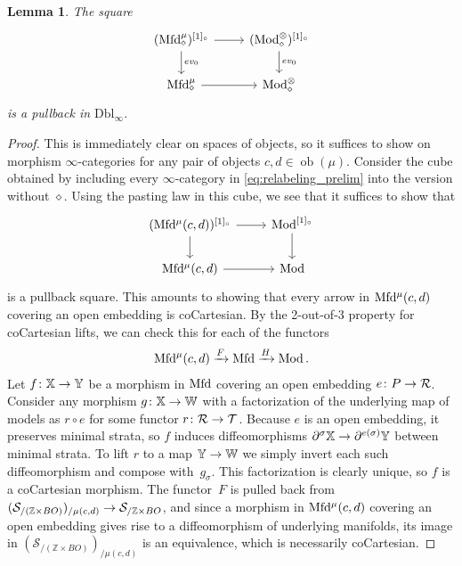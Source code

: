 \documentclass[10pt]{amsart}
\numberwithin{equation}{section}
\newtheorem{lem}[prop]{Lemma}
\theoremstyle{definition}
\DeclareMathOperator{\Mod}{Mod}
\DeclareMathOperator{\ob}{ob}
\newcommand{\Mfd}{\mathrm{Mfd}\vphantom{d}}
\newcommand{\bZ}{\mathbb{Z}}
\newcommand{\bX}{\mathbb{X}}
\newcommand{\bY}{\mathbb{Y}}
\newcommand{\bW}{\mathbb{W}}
\newcommand{\cS}{\mathcal{S}}
\newcommand{\cR}{\mathcal{R}}
\newcommand{\cT}{\mathcal{T}}
\newcommand{\Dbl}{\mathrm{Dbl}}
\newcommand{\del}{\partial}
\renewcommand{\to}{\mathchoice{\longrightarrow}{\rightarrow}{}{}}
\begin{document}
\begin{lem}\label{lem:relabeling_prelim}
	The square
	\begin{equation}\label{eq:relabeling_prelim}
		\begin{tikzcd}
			(\Mfd_{\diamond}^{\mu})^{[1]_{\circ}} \arrow[r] \arrow[d, "ev_{0}"]      &   (\Mod_{\diamond}^{\otimes})^{[1]_{\circ}}  \arrow[d, "ev_{0}"] \\
			\Mfd_{\diamond}^{\mu}  \arrow[r]               &   \Mod_{\diamond}^{\otimes}
		\end{tikzcd}
	\end{equation}
  is a pullback in $\Dbl_{\infty}$.
\end{lem}
\begin{proof}
	This is immediately clear on spaces of objects, so it suffices to show on morphism $\infty$-categories for any pair of objects $c,d\in \ob(\mu)$.
	Consider the cube obtained by including every $\infty$-category in \eqref{eq:relabeling_prelim} into the version without $\diamond$.
	Using the pasting law in this cube, we see that it suffices to show that
	\begin{equation*}
		\begin{tikzcd}
			(\Mfd^{\mu}(c,d))^{[1]_{\circ}} \arrow[r] \arrow[d]      &   \Mod^{[1]_{\circ}}  \arrow[d] \\
			\Mfd^{\mu}(c,d)  \arrow[r]               &   \Mod
		\end{tikzcd}
	\end{equation*}
	is a pullback square. This amounts to showing that every arrow in $\Mfd^{\mu}(c,d)$ covering an open embedding is coCartesian.
  By the 2-out-of-3 property for coCartesian lifts, we can check this for each of the functors
	\begin{align*}
		\Mfd^{\mu}(c,d) \xrightarrow{F} \Mfd \xrightarrow{H} \Mod.
	\end{align*}
	Let $f\colon \bX \to \bY$ be a morphism in $\Mfd$ covering an open embedding $e\colon P\to \cR$. Consider any morphism $g\colon \bX \to \bW$ with a factorization of the underlying map of models as $r\circ e$ for some functor $r\colon \cR \to \cT$. Because $e$ is an open embedding, it preserves minimal strata, so $f$ induces diffeomorphisms $\del^{\sigma}\bX \to \del^{e(\sigma)}\bY$ between minimal strata.
  To lift $r$ to a map $\bY \to \bW$ we simply invert each such diffeomorphism and compose with~$g_{\sigma}$.
  This factorization is clearly unique, so $f$ is a coCartesian morphism.
  The functor~$F$ is pulled back from $(\cS_{/ (\bZ\times BO)})_{/\mu(c,d)} \to \cS_{/ \bZ\times BO}$, and since a morphism in $\Mfd^{\mu}(c,d)$ covering an open embedding gives rise to a diffeomorphism of underlying manifolds, its image in $(\cS_{/ (\bZ\times BO)})_{/\mu(c,d)}$ is an equivalence, which is necessarily coCartesian.
\end{proof}
\end{document}
